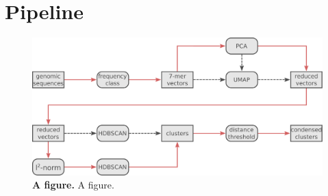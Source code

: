 \section{Pipeline} \label{sec:2.1}

\blindtext

\begin{figure}[!hbt]
    \includegraphics[width=\dimexpr\textwidth-2\fboxsep-2\fboxrule,fbox]{Extra_Graphics/Pipeline_V2.pdf}
    \caption[A figure]{\textbf{A figure.} A figure.}
    \label{fig:2.1.1}
\end{figure}